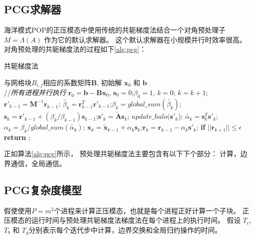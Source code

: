 \subsection{PCG求解器} 
\label{solver:pcg}
 
海洋模式POP的正压模态中使用传统的共轭梯度法结合一个对角预处理子$M = \Lambda(A)$ 作为它的默认求解器。 
这个默认求解器在小规模并行时效率很高。 
对角预处理的共轭梯度法的过程如下\ref{alg:pcg}： 

\begin{algorithm}[h]
\caption{共轭梯度法}
\label{alg:pcg}
\begin{algorithmic}[1]
\REQUIRE  与网格块$B_{i,j}$相应的系数矩阵$\textbf{B}$,  初始解 $\textbf{x}_0$ 和 $\textbf{b}$  \\
//\qquad    \textit{所有进程并行执行}
\STATE $\textbf{r}_0 = \textbf{b}-\textbf{B}\textbf{x}_0$, $\textbf{s}_0 =0$;\quad $\beta_0=1$, $k=0$;
\STATE $k=k+1$;\quad $\textbf{r}'_{k-1} =\textbf{M}^{-1}\textbf{r}_{k-1}$;\quad {}
\STATE $\tilde{\beta_k} = \textbf{r}_{k-1}^T\textbf{r}'_{k-1}$;\quad $\beta_k = global\_sum(\tilde{\beta_k})$; 
\STATE $\textbf{s}_k = \textbf{r}'_{k-1} +(\beta_k/\beta_{k-1})\textbf{s}_{k-1}$;\quad $\textbf{s}'_k = \tilde{\textbf{A}}\textbf{s}_k$; 
\STATE $update\_halo(\textbf{s}'_k$); 
\STATE $\tilde{\alpha_k} = \textbf{s}_k^T\textbf{s}'_k$;\quad $\alpha_k =\beta_k/ global\_sum(\tilde{\alpha_k})$;\quad {}
\STATE $\textbf{x}_k =\tilde{\textbf{x}}_{k-1} +\alpha_k \textbf{s}_k$;\quad $\textbf{r}_k =\textbf{r}_{k-1} -\alpha_k\textbf{s}'_k$;
\STATE \textbf{if} $||\textbf{r}_{k+1}|| \le \epsilon$  \textbf{return} ;
\ENDIF
\ENDWHILE
\end{algorithmic}
\end{algorithm}

 
正如算法\ref{alg:pcg}所示， 预处理共轭梯度法主要包含有以下下个部分： 计算，边界通信，全局通信。 
 
\subsection{PCG复杂度模型}
\label{solver:pcgComplex}
假使使用$P=m^2$个进程来计算正压模态，也就是每个进程正好计算一个子块。 
正压模态的运行时间与预处理共轭梯度法梯度法在每个进程上的执行时间。 
假设 $T_c$, $T_b$ 和 $T_g$分别表示每个迭代步中计算，边界交换和全局归约操作的时间。 

